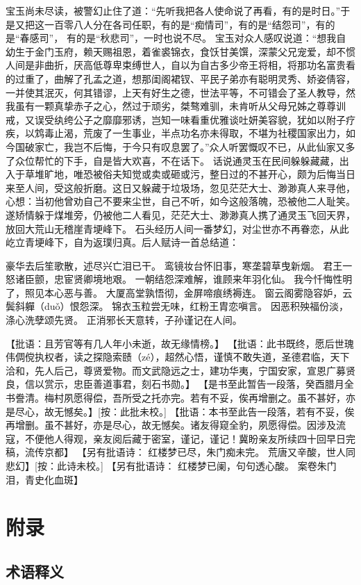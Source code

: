 \documentclass[12pt,oneside]{book}
\begin{document}
宝玉尚未尽读，被警幻止住了道：“先听我把各人使命说了再看，有的是时日。”于是又把这一百零八人分在各司任职，有的是“痴情司”，有的是“结怨司”，有的是“春感司”， 有的是“秋悲司”，一时也说不尽。
宝玉对众人感叹说道：“想我自幼生于金门玉府，赖天赐祖恩，着雀裘锦衣，食饫甘美馔，深蒙父兄宠爱，却不惯人间是非曲折，厌高低尊卑束缚世人，自以为自古多少帝王将相，将那功名富贵看的过重了，曲解了孔孟之道，想那闺阁裙钗、平民子弟亦有聪明灵秀、娇姿倩容，一并使其泯灭，何其错谬，上天有好生之德，世法平等，不可错会了圣人教导，然我虽有一颗真挚赤子之心，然过于顽劣，桀骜难驯，未肯听从父母兄姊之尊尊训戒，又误受纨绔公子之靡靡邪诱，岂知一味看重优雅谈吐妍美容貌，犹如以附子疗疾，以鸩毒止渴，荒废了一生事业，半点功名亦未得取，不堪为社稷国家出力，如今国破家亡，我岂不后悔，于今只有叹息罢了。”众人听罢慨叹不已，从此仙家又多了众位帮忙的下手，自是皆大欢喜，不在话下。
话说通灵玉在民间躲躲藏藏，出入于草堆旷地，唯恐被俗夫知觉或卖或砸或污，整日过的不甚开心，颇为后悔当日来至人间，受这般折磨。这日又躲藏于垃圾场，忽见茫茫大士、渺渺真人来寻他，心想：当初他曾劝自己不要来尘世，自己不听，如今这般落魄，恐被他二人耻笑。遂矫情躲于煤堆旁，仍被他二人看见，茫茫大士、渺渺真人携了通灵玉飞回天界，放回大荒山无稽崖青埂峰下。
石头经历人间一番梦幻，对尘世亦不再眷恋，从此屹立青埂峰下，自为返璞归真。后人赋诗一首总结道：

豪华去后笙歌散，述尽兴亡泪已干。
鸾镜妆台怀旧事，寒垄碧草曳新烟。
君王一怒诸臣颤，忠宦贤卿境地艰。
一朝结怨深难解，谁顾来年羽化仙。
我今忏悔性明了，照见本心恶与善。
大厦高堂孰悟彻，金屏啼痕绣褥连。
窗云阁雾隐容妒，云鬓斜軃（duǒ）恨怨深。
锦衣玉粒尝无味，红粉王胄恋嗔言。
因恶积殃福份淡，涤心洗孽颂先贤。
正消邪长天意转，子孙谨记在人间。

【批语：且芳官等有几人年小未逝，故无缘情榜。】
【批语：此书既终，愿后世瑰伟倜傥执权者，读之探隐索赜（zé），超然心悟，谨慎不敢失道，圣德君临，天下洽和，先人后己，尊贤爱物。而文武隐远之士，建功华夷，宁国安家，宣恩广募贤良，信以赏示，忠臣善道事君，刻石书勋。】
【是书至此暂告一段落，癸酉腊月全书誊清。梅村夙愿得偿，吾所受之托亦完。若有不妥，俟再增删之。虽不甚好，亦是尽心，故无憾矣。】[按：此批未校。]
【批语：本书至此告一段落，若有不妥，俟再增删。虽不甚好，亦是尽心，故无憾矣。诸友得窥全豹，夙愿得偿。因涉及流寇，不便他人得观，亲友阅后藏于密室，谨记，谨记！冀盼亲友所续四十回早日完稿，流传京都】
【另有批语诗：
红楼梦已尽，朱门痴未完。
荒唐又辛酸，世人同悲幻】[按：此诗未校。]
【另有批语诗：
红楼梦已阑，句句透心酸。
案卷朱门泪，青史化血斑】







\appendix
\part{附录}
\chapter{术语释义}



\backmatter
\end{document}
